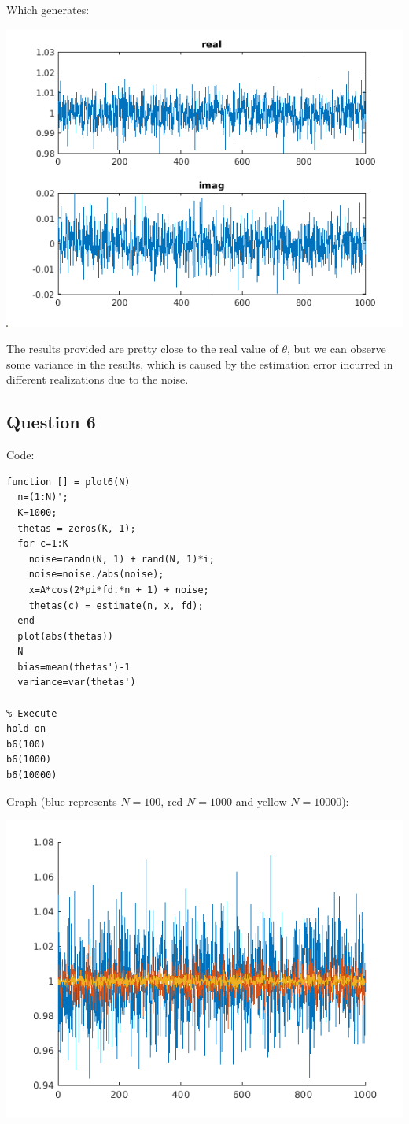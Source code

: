 \documentclass[conference,9pt]{IEEEtran}
\begin{document}
Which generates:

\includegraphics[scale=0.6]{b5}

The results provided are pretty close to the real value of $\theta$, but we can observe some variance in the results, which is caused by the estimation error incurred in different realizations due to the noise.

\subsection{Question 6}
Code:
\begin{verbatim}
function [] = plot6(N)
  n=(1:N)';
  K=1000;
  thetas = zeros(K, 1);
  for c=1:K
    noise=randn(N, 1) + rand(N, 1)*i;
    noise=noise./abs(noise);
    x=A*cos(2*pi*fd.*n + 1) + noise;
    thetas(c) = estimate(n, x, fd);
  end
  plot(abs(thetas))
  N
  bias=mean(thetas')-1
  variance=var(thetas')

% Execute
hold on
b6(100)
b6(1000)
b6(10000)
\end{verbatim}

Graph (blue represents $N=100$, red $N=1000$ and yellow $N=10000$):

\includegraphics[scale=0.6]{b6}
\end{document}
